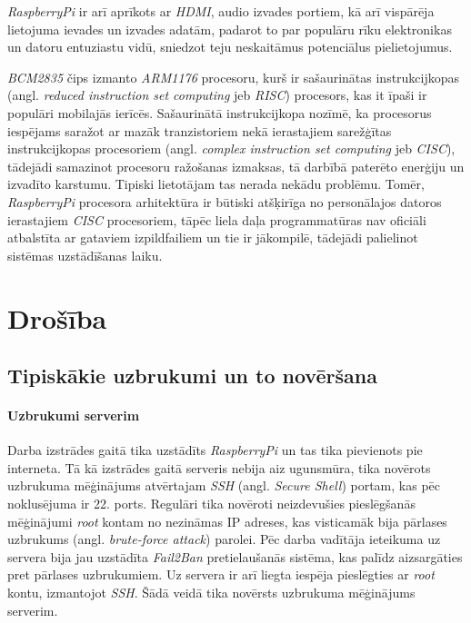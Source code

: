 \textit{RaspberryPi} ir arī aprīkots ar \textit{HDMI}, audio izvades portiem, kā arī vispārēja lietojuma ievades un izvades adatām, padarot to par populāru rīku elektronikas un datoru entuziastu vidū, sniedzot teju neskaitāmus potenciālus pielietojumus.

\textit{BCM2835} čips izmanto \textit{ARM1176} procesoru, kurš ir sašaurinātas instrukcijkopas (angl. \textit{reduced instruction set computing} jeb \textit{RISC}) procesors, kas it īpaši ir populāri mobilajās ierīcēs. Sašaurinātā instrukcijkopa nozīmē, ka procesorus iespējams saražot ar mazāk tranzistoriem nekā ierastajiem sarežģītas instrukcijkopas procesoriem (angl. \textit{complex instruction set computing} jeb \textit{CISC}), tādejādi samazinot procesoru ražošanas izmaksas, tā darbībā paterēto enerģiju un izvadīto karstumu.
Tipiski lietotājam tas nerada nekādu problēmu. Tomēr, \textit{RaspberryPi} procesora arhitektūra ir būtiski atšķirīga no personālajos datoros ierastajiem \textit{CISC} procesoriem, tāpēc liela daļa programmatūras nav oficiāli atbalstīta ar gataviem izpildfailiem un tie ir jākompilē, tādejādi palielinot sistēmas uzstādīšanas laiku.

\chapter{Drošība}

\section{Tipiskākie uzbrukumi un to novēršana} \label{Attacks}
\subsubsection{Uzbrukumi serverim}
Darba izstrādes gaitā tika uzstādīts \textit{RaspberryPi} un tas tika pievienots pie interneta. Tā kā izstrādes gaitā serveris nebija aiz ugunsmūra, tika novērots uzbrukuma mēģinājums atvērtajam \textit{SSH} (angl. \textit{Secure Shell}) portam, kas pēc noklusējuma ir 22. ports. Regulāri tika novēroti neizdevušies pieslēgšanās mēģinājumi \textit{root} kontam no nezināmas IP adreses, kas visticamāk bija pārlases uzbrukums (angl. \textit{brute-force attack}) parolei. Pēc darba vadītāja ieteikuma uz servera bija jau uzstādīta \textit{Fail2Ban} pretielaušanās sistēma, kas palīdz aizsargāties pret pārlases uzbrukumiem. Uz servera ir arī liegta iespēja pieslēgties ar \textit{root} kontu, izmantojot \textit{SSH}. Šādā veidā tika novērsts uzbrukuma mēģinājums serverim.

